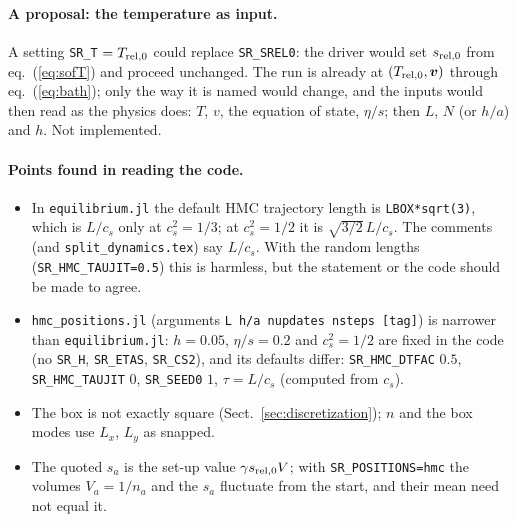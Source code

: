 \documentclass[11pt,aps,preprint,nofootinbib,superscriptaddress,tightenlines]{revtex4-2}
\def\Eq#1{eq.~(\ref{#1})}
\def\Sect#1{Sect.~\ref{#1}}
\let\oldparagraph\paragraph
\renewcommand{\paragraph}{\par\bigskip\oldparagraph}
\begin{document}
\paragraph{A proposal: the temperature as input.}
\label{sec:proposal}
A setting \texttt{SR\_T} $=T_{\rm rel,0}$ could replace \texttt{SR\_SREL0}: the driver would set $s_{\rm rel,0}$ from \Eq{eq:sofT} and proceed
unchanged.  The run is already at $(T_{\rm rel,0},\bm v)$ through \Eq{eq:bath}; only the way it is named would change, and the inputs
would then read as the physics does: $T$, $v$, the equation of state, $\eta/s$; then $L$, $N$ (or $h/a$) and $h$.  Not implemented.

\paragraph{Points found in reading the code.}
\begin{itemize}
\item In \texttt{equilibrium.jl} the default HMC trajectory length is \texttt{LBOX*sqrt(3)}, which is $L/c_s$ only at $c_s^2=1/3$; at
  $c_s^2=1/2$ it is $\sqrt{3/2}\,L/c_s$.  The comments (and \texttt{split\_dynamics.tex}) say $L/c_s$.  With the random lengths
  (\texttt{SR\_HMC\_TAUJIT=0.5}) this is harmless, but the statement or the code should be made to agree.
\item \texttt{hmc\_positions.jl} (arguments \texttt{L h/a nupdates nsteps [tag]}) is narrower than \texttt{equilibrium.jl}: $h=0.05$,
  $\eta/s=0.2$ and $c_s^2=1/2$ are fixed in the code (no \texttt{SR\_H}, \texttt{SR\_ETAS}, \texttt{SR\_CS2}), and its defaults differ:
  \texttt{SR\_HMC\_DTFAC} $0.5$, \texttt{SR\_HMC\_TAUJIT} $0$, \texttt{SR\_SEED0} $1$, $\tau=L/c_s$ (computed from $c_s$).
\item The box is not exactly square (\Sect{sec:discretization}); $n$ and the box modes use $L_x$, $L_y$ as snapped.
\item The quoted $s_a$ is the set-up value $\gamma s_{\rm rel,0}V$; with \texttt{SR\_POSITIONS=hmc} the volumes $V_a=1/n_a$ and the $s_a$
  fluctuate from the start, and their mean need not equal it.
\end{itemize}
\end{document}
